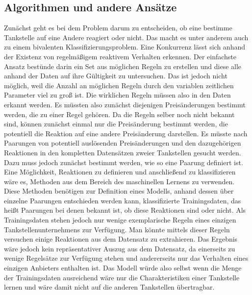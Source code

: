 \subsection{Algorithmen und andere Ansätze}
Zunächst geht es bei dem Problem darum zu entscheiden, ob eine bestimme Tankstelle auf eine Andere reagiert oder nicht. Das macht es unter anderem auch zu einem bivalenten Klassifizierungsproblem. Eine Konkurrenz lässt sich anhand der Existenz von regelmäßigem reaktivem Verhalten erkennen. Der einfachste Ansatz bestünde darin ein Set aus möglichen Regeln zu erstellen und diese alle anhand der Daten auf ihre Gültigkeit zu untersuchen. Das ist jedoch nicht möglich, weil die Anzahl an möglichen Regeln durch den variablen zeitlichen Parameter viel zu groß ist. Die wirklichen Regeln müssen also in den Daten erkannt werden. Es müssten also zunächst diejenigen Preisänderungen bestimmt werden, die zu einer Regel gehören. Da die Regeln selber noch nicht bekannt sind, können zunächst einmal nur die Preisänderung  bestimmt werden, die potentiell die Reaktion auf eine andere Preisänderung darstellen. Es müsste nach Paarungen von potentiell auslösenden Preisänderungen und den dazugehörigen Reaktionen in den kompletten Datensätzen zweier Tankstellen gesucht werden. Dazu muss jedoch zunächst bestimmt werden, wie so eine Paarung definiert ist.\\

Eine Möglichkeit, Reaktionen zu definieren und anschließend zu klassifizieren wäre es, Methoden aus dem Bereich des maschinellen Lernens zu verwenden. Diese Methoden benötigen zur Definition eines Modells, anhand dessen über einzelne Paarungen entschieden werden kann, klassifizierte Trainingsdaten, das heißt Paarungen bei denen bekannt ist, ob diese Reaktionen sind oder nicht. Als Trainingsdaten stehen jedoch nur wenige exemplarische Regeln eines einzigen Tankstellenunternehmens zur Verfügung. Man könnte mittels dieser Regeln versuchen einige Reaktionen aus dem Datensatz zu extrahieren. Das Ergebnis wäre jedoch kein repräsentativer Auszug aus dem Datensatz, da einerseits zu wenige Regelsätze zur Verfügung stehen und andererseits nur das Verhalten eines einzigen Anbieters enthalten ist. Das Modell würde also selbst wenn die Menge der Trainingsdaten ausreichend wäre nur die Charakteristiken einer Tankstelle lernen und wäre damit nicht auf die anderen Tankstellen übertragbar.\\

